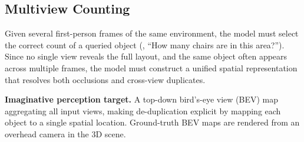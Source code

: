 



\subsection{Multiview Counting}
\label{sec:multiview_counting}


Given several first-person frames of the same environment, the model must select the correct count of a queried object (\eg, ``How many chairs are in this area?''). Since no single view reveals the full layout, and the same object often appears across multiple frames, the model must construct a unified spatial representation that resolves both occlusions and cross-view duplicates.

\noindent\textbf{Imaginative perception target.} A top-down bird's-eye view (BEV) map aggregating all input views, making de-duplication explicit by mapping each object to a single spatial location. Ground-truth BEV maps are rendered from an overhead camera in the 3D scene.


